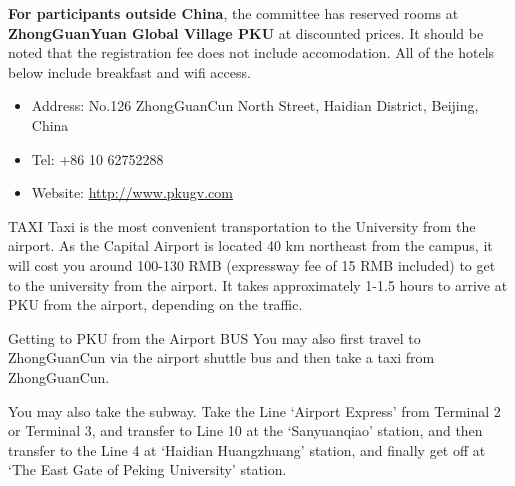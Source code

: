 {}
\textbf{For participants outside China}, the committee has reserved rooms at \textbf{ZhongGuanYuan Global Village PKU} at discounted prices. It should be noted that the registration fee does not include accomodation. All of the hotels below include breakfast and wifi access. 
\begin{itemize}
\item Address: No.126 ZhongGuanCun North Street, Haidian District, Beijing, China
\item Tel:  +86 10 62752288
\item Website: \url{http://www.pkugv.com}
\end{itemize}

{}
TAXI Taxi is the most convenient transportation to the University from the airport. As the Capital Airport is located 40 km northeast from the campus, it will cost you around 100-130 RMB (expressway fee of 15 RMB included) to get to the university from the airport. It takes approximately 1-1.5 hours to arrive at PKU from the airport, depending on the traffic.

Getting to PKU from the Airport BUS You may also first travel to ZhongGuanCun via the airport shuttle bus and then take a taxi from ZhongGuanCun.



You may also take the subway. Take the Line `Airport Express' from Terminal 2 or Terminal 3, and transfer to Line 10 at the `Sanyuanqiao' station, and then transfer to the Line 4 at `Haidian Huangzhuang' station, and finally get off at `The East Gate of Peking University' station.

